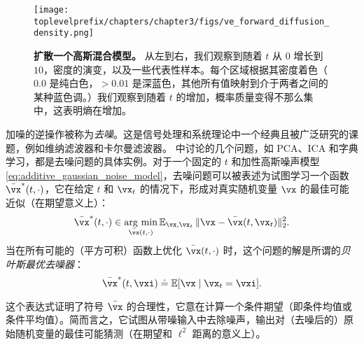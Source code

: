 \documentclass[../../book-main.tex]{subfiles}
\begin{document}
\begin{figure}
	\texttt{[image: \\toplevelprefix/chapters/chapter3/figs/ve\_forward\_diffusion\_density.png]}
	\caption{\small\textbf{扩散一个高斯混合模型。} 从左到右，我们观察到随着 \(t\) 从 \(0\) 增长到 \(10\)，密度的演变，以及一些代表性样本。每个区域根据其密度着色（\(0.0\) 是纯白色，\(> 0.01\) 是深蓝色，其他所有值映射到介于两者之间的某种蓝色调。）我们观察到随着 \(t\) 的增加，概率质量变得不那么集中，这表明熵在增加。}
	\label{fig:ve_forward_density}
\end{figure}

加噪的逆操作被称为\textit{去噪}。这是信号处理和系统理论中一个经典且被广泛研究的课题，例如维纳滤波器和卡尔曼滤波器。 中讨论的几个问题，如 PCA、ICA 和字典学习，都是去噪问题的具体实例。对于一个固定的 \(t\) 和加性高斯噪声模型 \eqref{eq:additive_gaussian_noise_model}，去噪问题可以被表述为试图学习一个函数 \(\bar{\vx}^{\ast}(t, \cdot)\)，它在给定 \(t\) 和 \(\vx_{t}\) 的情况下，形成对真实随机变量 \(\vx\) 的最佳可能近似（在期望意义上）：
\begin{equation}\label{eq:denoising_loss}
	\bar{\vx}^{\ast}(t, \cdot) \in \argmin_{\bar{\vx}(t, \cdot)}\Ex_{\vx, \vx_{t}}\norm{\vx - \bar{\vx}(t, \vx_{t})}_{2}^{2}.
\end{equation}
当在所有可能的（平方可积）函数上优化 \(\bar{\vx}(t, \cdot)\) 时，这个问题的解是所谓的\textit{贝叶斯最优去噪器}：
\begin{equation}\label{eq:optimal_denoiser}
	\bar{\vx}^{\ast}(t, \vxi) \doteq \Ex[\vx \mid \vx_{t} = \vxi].
\end{equation}

这个表达式证明了符号 \(\bar{\vx}\) 的合理性，它意在计算一个条件期望（即条件均值或条件平均值）。简而言之，它试图从带噪输入中去除噪声，输出对（去噪后的）原始随机变量的最佳可能猜测（在期望和 \(\ell^{2}\) 距离的意义上）。
\end{document}
